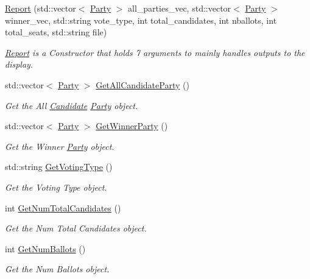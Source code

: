 \begin{DoxyCompactItemize}
\item 
\mbox{\label{classReport_a239df3fc6679ba0b01e54eda0fd8c34f}} 
\hyperlink{classReport_a239df3fc6679ba0b01e54eda0fd8c34f}{Report} (std\+::vector$<$ \hyperlink{classParty}{Party} $>$ all\+\_\+parties\+\_\+vec, std\+::vector$<$ \hyperlink{classParty}{Party} $>$ winner\+\_\+vec, std\+::string vote\+\_\+type, int total\+\_\+candidates, int nballots, int total\+\_\+seats, std\+::string file)
\begin{DoxyCompactList}\small\item\em \hyperlink{classReport}{Report} is a Constructor that holds 7 arguments to mainly handles outputs to the display. \end{DoxyCompactList}\item 
std\+::vector$<$ \hyperlink{classParty}{Party} $>$ \hyperlink{classReport_a079f554f0c4b3c918f9a00bd83bdddd5}{Get\+All\+Candidate\+Party} ()
\begin{DoxyCompactList}\small\item\em Get the All \hyperlink{classCandidate}{Candidate} \hyperlink{classParty}{Party} object. \end{DoxyCompactList}\item 
std\+::vector$<$ \hyperlink{classParty}{Party} $>$ \hyperlink{classReport_a615da7011e9370130181f8d24fa001d6}{Get\+Winner\+Party} ()
\begin{DoxyCompactList}\small\item\em Get the Winner \hyperlink{classParty}{Party} object. \end{DoxyCompactList}\item 
std\+::string \hyperlink{classReport_aaa2157ab3c123a4b9aa4e02f327cba08}{Get\+Voting\+Type} ()
\begin{DoxyCompactList}\small\item\em Get the Voting Type object. \end{DoxyCompactList}\item 
int \hyperlink{classReport_a67565c88d75816e4c427f0a45a8ba288}{Get\+Num\+Total\+Candidates} ()
\begin{DoxyCompactList}\small\item\em Get the Num Total Candidates object. \end{DoxyCompactList}\item 
int \hyperlink{classReport_a33195efe7c13185cdb887eb4e51176c8}{Get\+Num\+Ballots} ()
\begin{DoxyCompactList}\small\item\em Get the Num Ballots object. \end{DoxyCompactList}\item 

\end{DoxyCompactItemize}
